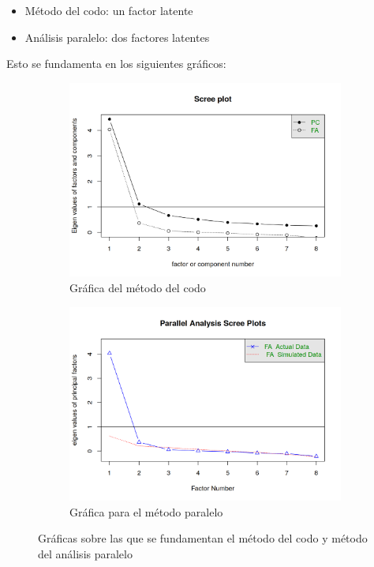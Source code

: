 \documentclass[11pt]{article}
\begin{document}
\begin{itemize}
    \item Método del codo: un factor latente
    \item Análisis paralelo: dos factores latentes
\end{itemize}

Esto se fundamenta en los siguientes gráficos:

\begin{figure}[H]
    \centering
    \begin{subfigure}{0.45\textwidth}
        \includegraphics[width=1.0\textwidth]{fa_codo}
        \caption{Gráfica del método del codo}
    \end{subfigure}
    \begin{subfigure}{0.45\textwidth}
        \includegraphics[width=1.0\textwidth]{fa_paralelo}
        \caption{Gráfica para el método paralelo}
    \end{subfigure}

    \caption{Gráficas sobre las que se fundamentan el método del codo y método del análisis paralelo}
\end{figure}
\end{document}
